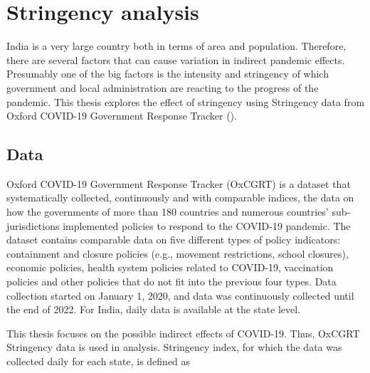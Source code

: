\documentclass[12pt,a4paper,notitlepage]{article}
\begin{document}
\newpage
\section{Stringency analysis} \label{sec:stringency}

India is a very large country both in terms of area and population. Therefore, there are several factors that can cause variation in indirect pandemic effects. Presumably one of the big factors is the intensity and stringency of which government and local administration are reacting to the progress of the pandemic. This thesis explores the effect of stringency using Stringency data from Oxford COVID-19 Government Response Tracker (\citet{Hale2021}).

\subsection{Data} \label{subsec:stringencyData}

Oxford COVID-19 Government Response Tracker (OxCGRT) is a dataset that systematically collected, continuously and with comparable indices, the data on how the governments of more than 180 countries and numerous countries' sub-jurisdictions implemented policies to respond to the COVID-19 pandemic. The dataset contains comparable data on five different types of policy indicators: containment and closure policies (e.g., movement restrictions, school closures), economic policies, health system policies related to COVID-19, vaccination policies and other policies that do not fit into the previous four types. Data collection started on January 1, 2020, and data was continuously collected until the end of 2022. For India, daily data is available at the state level.

This thesis focuses on the possible indirect effects of COVID-19. Thus, OxCGRT Stringency data is used in analysis. Stringency index, for which the data was collected daily for each state, is defined as
\end{document}
